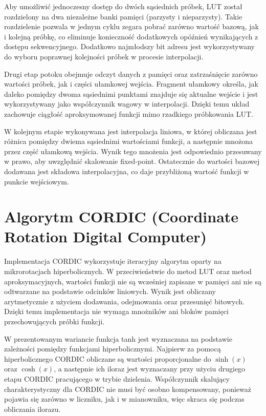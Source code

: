 \documentclass[12pt, a4paper, oneside]{scrreprt}
\begin{document}
Aby umożliwić jednoczesny dostęp do dwóch sąsiednich próbek, LUT został rozdzielony
na dwa niezależne banki pamięci (parzysty i nieparzysty). Takie rozdzielenie pozwala
w jednym cyklu zegara pobrać zarówno wartość bazową, jak i kolejną próbkę,
co eliminuje konieczność dodatkowych opóźnień wynikających z dostępu sekwencyjnego.
Dodatkowo najmłodszy bit adresu jest wykorzystywany do wyboru poprawnej kolejności
próbek w procesie interpolacji.

Drugi etap potoku obejmuje odczyt danych z pamięci oraz zatrzaśnięcie zarówno wartości
próbek, jak i części ułamkowej wejścia. Fragment ułamkowy określa, jak daleko pomiędzy
dwoma sąsiednimi punktami znajduje się aktualne wejście i jest wykorzystywany jako
współczynnik wagowy w interpolacji. Dzięki temu układ zachowuje ciągłość aproksymowanej
funkcji mimo rzadkiego próbkowania LUT.

W kolejnym etapie wykonywana jest interpolacja liniowa, w której obliczana jest różnica
pomiędzy dwiema sąsiednimi wartościami funkcji, a następnie mnożona przez część ułamkową
wejścia. Wynik tego mnożenia jest odpowiednio przesuwany w prawo, aby uwzględnić skalowanie
fixed-point. Ostatecznie do wartości bazowej dodawana jest składowa interpolacyjna,
co daje przybliżoną wartość funkcji w punkcie wejściowym.

\section{Algorytm CORDIC (Coordinate Rotation Digital Computer)}


Implementacja CORDIC wykorzystuje iteracyjny algorytm oparty na mikrorotacjach hiperbolicznych.
W przeciwieństwie do metod LUT oraz metod aproksymacyjnych, wartości funkcji nie są wcześniej
zapisane w pamięci ani nie są odtwarzane na podstawie odcinków liniowych.
Wynik jest obliczany arytmetycznie z użyciem dodawania, odejmowania oraz przesunięć
bitowych. Dzięki temu implementacja nie wymaga mnożników ani bloków pamięci przechowujących
próbki funkcji.

W prezentowanym wariancie funkcja tanh jest wyznaczana na podstawie zależności pomiędzy
funkcjami hiperbolicznymi. Najpierw za pomocą hiperbolicznego CORDIC obliczane są wartości
proporcjonalne do $\sinh(x)$ oraz $\cosh(x)$, a następnie ich iloraz jest wyznaczany przy
użyciu drugiego etapu CORDIC pracującego w trybie dzielenia. Współczynnik skalujący
charakterystyczny dla CORDIC nie musi być osobno kompensowany, ponieważ pojawia się
zarówno w liczniku, jak i w mianowniku, więc skraca się podczas obliczania ilorazu.
\end{document}
